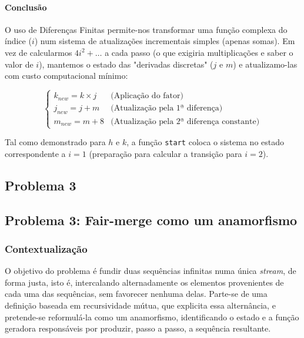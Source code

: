 \documentclass[11pt, a4paper, fleqn]{article}
\begin{document}
\paragraph{Conclusão}
O uso de Diferenças Finitas permite-nos transformar uma função complexa do índice ($i$) num sistema de atualizações incrementais simples (apenas somas).
Em vez de calcularmos $4i^2 + \dots$ a cada passo (o que exigiria multiplicações e saber o valor de $i$), mantemos o estado das "derivadas discretas" ($j$ e $m$) e atualizamo-las com custo computacional mínimo:

\begin{equation}
\begin{cases}
    k_{new} = k \times j & \text{(Aplicação do fator)} \\
    j_{new} = j + m & \text{(Atualização pela 1ª diferença)} \\
    m_{new} = m + 8 & \text{(Atualização pela 2ª diferença constante)}
\end{cases}
\end{equation}

\noindent Tal como demonstrado para $h$ e $k$, a função \texttt{start} coloca o sistema no estado correspondente a $i=1$ (preparação para calcular a transição para $i=2$).


\subsection*{Problema 3}

\subsection*{Problema 3: Fair-merge como um anamorfismo}


\subsubsection*{Contextualização}

\noindent O objetivo do problema é fundir duas sequências infinitas numa única \textit{stream}, de forma justa, isto é, intercalando alternadamente os elementos provenientes de cada uma das sequências, sem favorecer nenhuma delas.
Parte-se de uma definição baseada em recursividade mútua, que explicita essa alternância, e pretende-se reformulá-la como um anamorfismo, identificando o estado e a função geradora responsáveis por produzir, passo a passo, a sequência resultante.
\end{document}
